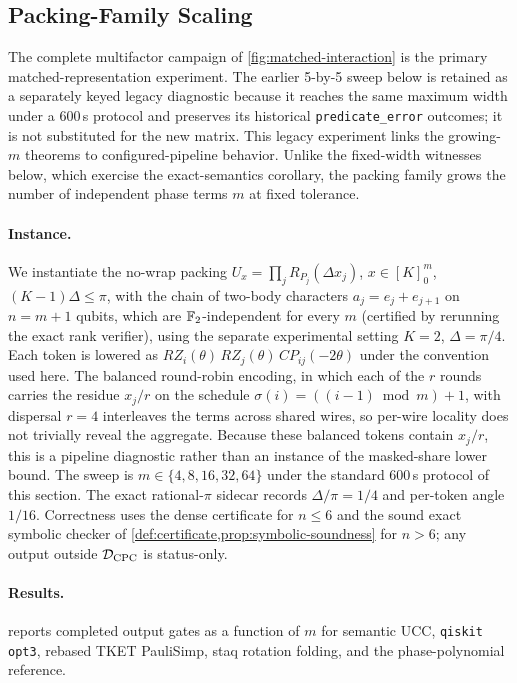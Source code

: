 \subsection{Packing-Family Scaling}
\label{sec:packing-scaling}

The complete multifactor campaign of \cref{fig:matched-interaction}
is the primary matched-representation experiment.  The earlier 5-by-5 sweep
below is retained as a separately keyed legacy diagnostic because it reaches
the same maximum width under a 600\,s protocol and preserves its historical
\texttt{predicate\_error} outcomes; it is not substituted for the new matrix.
This legacy experiment links the growing-$m$ theorems to configured-pipeline
behavior. Unlike the fixed-width witnesses below, which exercise the
exact-semantics corollary, the packing family grows the number of
independent phase terms $m$ at fixed tolerance.

\paragraph{Instance.}
We instantiate the no-wrap packing $U_x=\prod_jR_{P_j}(\Delta x_j)$,
$x\in[K]_0^m$, $(K-1)\Delta\leq\pi$, with the chain of two-body
characters $a_j = e_j + e_{j+1}$ on $n = m+1$ qubits, which are
$\mathbb{F}_2$-independent for every $m$ (certified by rerunning the exact rank
verifier), using the separate experimental setting $K=2$, $\Delta=\pi/4$.
Each token is lowered as
$RZ_i(\theta)\,RZ_j(\theta)\,CP_{ij}(-2\theta)$ under the convention
used here. The balanced round-robin encoding, in which each of the $r$ rounds
carries the residue $x_j/r$ on the schedule $\sigma(i)=((i-1)\bmod m)+1$,
with dispersal $r = 4$ interleaves the
terms across shared wires, so per-wire locality does not trivially reveal
the aggregate.  Because these balanced tokens contain $x_j/r$, this is a
pipeline diagnostic rather than an instance of the masked-share lower
bound. The sweep is $m \in \{4, 8, 16, 32, 64\}$ under the
standard 600\,s protocol of this section.  The exact rational-$\pi$ sidecar
records $\Delta/\pi=1/4$ and per-token angle $1/16$.  Correctness uses the
dense certificate for $n\leq6$ and the sound exact symbolic checker of
\cref{def:certificate,prop:symbolic-soundness} for $n>6$; any output outside
$\mathcal D_{\rm CPC}$ is status-only.

\paragraph{Results.}
 reports completed output gates as a function of $m$
for semantic UCC, \texttt{qiskit opt3}, rebased TKET PauliSimp, staq
rotation folding, and the phase-polynomial reference.
\pkResultsSummary

